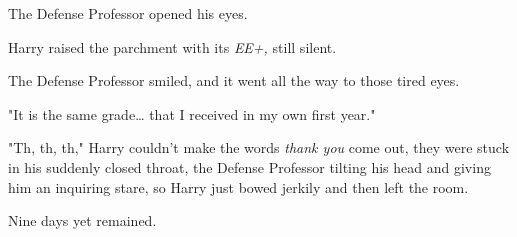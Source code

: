 The Defense Professor opened his eyes.

Harry raised the parchment with its \emph{EE+,} still silent.

The Defense Professor smiled, and it went all the way to those tired eyes.

"It is the same grade{\ldots} that I received in my own first year."

"Th, th, th," Harry couldn't make the words \emph{thank you} come out, they 
were stuck in his suddenly closed throat, the Defense Professor tilting his 
head and giving him an inquiring stare, so Harry just bowed jerkily and then 
left the room.

Nine days yet remained.
